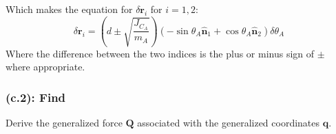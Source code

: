 \documentclass[titlepage]{article}
\begin{document}
\begin{mdframed}[linewidth=1pt, innertopmargin=10pt, innerbottommargin=10pt]
	Which makes the equation for $\delta\boldsymbol{r}_i$ for $i=1,2$:
	\begin{equation}
		\delta\boldsymbol{r}_i=\left(d\pm\sqrt{\frac{J_{C_A}}{m_A}}\right)\left(-\sin\theta_A\hat{\boldsymbol{n}}_1+\cos\theta_A\hat{\boldsymbol{n}}_2\right)\delta\theta_A
	\end{equation}
	Where the difference between the two indices is the plus or minus sign of $\pm$ where appropriate.
\end{mdframed}

\subsubsection*{(c.2): Find}
Derive the generalized force $\boldsymbol{Q}$ associated with the generalized coordinates $\boldsymbol{q}$.\\
\end{document}
